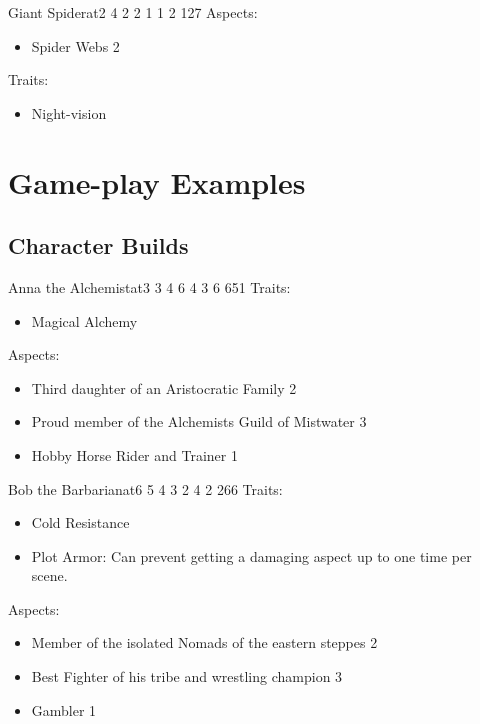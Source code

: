 \documentclass[11pt]{article}
\begin{document}
{\begin{npc}{Giant Spider}{at}{2 4 2 2 1 1 2 1}{27}
Aspects:
\begin{itemize}
\item Spider Webs 2
\end{itemize}
Traits:
\begin{itemize}
\item Night-vision
\end{itemize}
\end{npc}


\newpage
\section{Game-play Examples}
\label{sec:org9615855}
\subsection{Character Builds}
\label{sec:orgc21a540}

\begin{npc}{Anna the Alchemist}{at}{3 3 4 6 4 3 6 6}{51}
Traits:
\begin{itemize}
\item Magical Alchemy
\end{itemize}
\columnbreak
Aspects:
\begin{itemize}
\item Third daughter of an Aristocratic Family 2
\item Proud member of the Alchemists Guild of Mistwater 3
\item Hobby Horse Rider and Trainer 1
\end{itemize}
\end{npc}

\begin{npc}{Bob the Barbarian}{at}{6 5 4 3 2 4 2 2}{66}
Traits:
\begin{itemize}
\item Cold Resistance
\item Plot Armor: Can prevent getting a damaging aspect up to one time per scene.
\end{itemize}
\columnbreak

Aspects:
\begin{itemize}
\item Member of the isolated Nomads of the eastern steppes 2
\item Best Fighter of his tribe and wrestling champion 3
\item Gambler 1
\end{itemize}
\end{npc}

}
\end{document}
